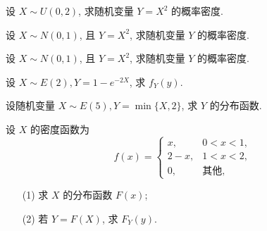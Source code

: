 \documentclass[padp]{ExBook}
\begin{document}
\begin{qitems}
\begin{bbox}
\begin{enumerate}
\end{enumerate}
    \end{bbox}
     \begin{bbox}
        \qitem  设 $X \sim U(0,2)$, 求随机变量 $Y=X^2$ 的概率密度.
    \end{bbox}
    \begin{bbox}
        \qitem  设 $X \sim N(0,1)$, 且 $Y=X^2$, 求随机变量 $Y$ 的概率密度.
    \end{bbox}
        \begin{bbox}
        \qitem  设 $X \sim N(0,1)$, 且 $Y=X^2$, 求随机变量 $Y$ 的概率密度.
    \end{bbox}
        \begin{bbox}
        \qitem  设 $X \sim E(2), Y=1-e^{-2X}$, 求 $f_Y(y)$.
    \end{bbox}
        \begin{bbox}
        \qitem   设随机变量 $X \sim E(5), Y=\min\{X, 2\}$, 求 $Y$ 的分布函数.
    \end{bbox}
        \begin{bbox}
        \qitem  设 $X$ 的密度函数为
$$ f(x) = 
\begin{cases}
x, & 0 < x < 1, \\
2-x, & 1 < x < 2, \\
0, & \text{其他},
\end{cases}
$$
\begin{enumerate}
    \item[(1)] 求 $X$ 的分布函数 $F(x)$;
    \item[(2)] 若 $Y=F(X)$, 求 $F_Y(y)$.
\end{enumerate}
    \end{bbox}
\end{qitems}
\end{document}
